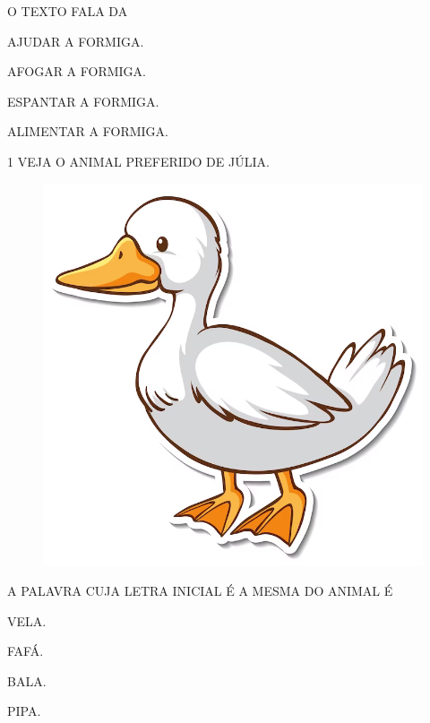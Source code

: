 O TEXTO FALA DA

\begin{escolha}

\item AJUDAR A FORMIGA.

\item AFOGAR A FORMIGA.

\item ESPANTAR A FORMIGA.

\item ALIMENTAR A FORMIGA.

\end{escolha}

\blankpage
\vspace*{-3.4cm}


\num{1} VEJA O ANIMAL PREFERIDO DE JÚLIA.

\begin{figure}[H]
\centering
\includegraphics[width=.6\textwidth]{./media/image238.png}
\end{figure}

A PALAVRA CUJA LETRA INICIAL É A MESMA DO ANIMAL É

\begin{escolha}

\item VELA.

\item FAFÁ.

\item BALA.

\item PIPA.

\end{escolha}

